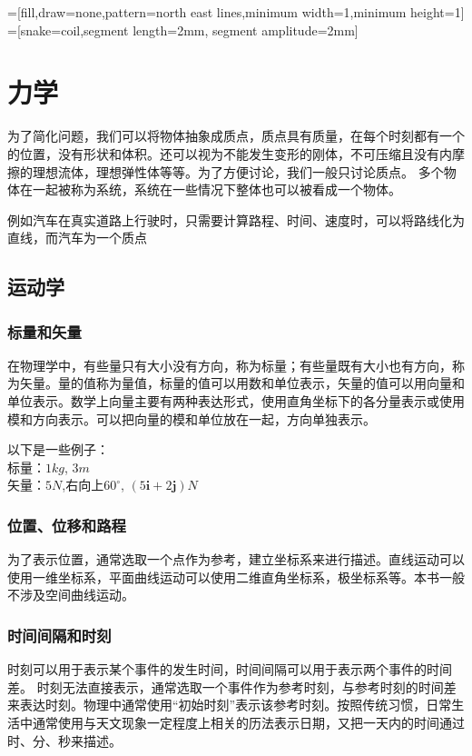 \usetikzlibrary{snakes, patterns}
=[fill,draw=none,pattern=north east lines,minimum width=1,minimum height=1]
=[snake=coil,segment length=2mm, segment amplitude=2mm]

\part{力学}
为了简化问题，我们可以将物体抽象成质点，质点具有质量，在每个时刻都有一个的位置，没有形状和体积。还可以视为不能发生变形的刚体，不可压缩且没有内摩擦的理想流体，理想弹性体等等。为了方便讨论，我们一般只讨论质点。
多个物体在一起被称为系统，系统在一些情况下整体也可以被看成一个物体。

例如汽车在真实道路上行驶时，只需要计算路程、时间、速度时，可以将路线化为直线，而汽车为一个质点

\chapter{运动学}
\section{标量和矢量}
在物理学中，有些量只有大小没有方向，称为标量；有些量既有大小也有方向，称为矢量。量的值称为量值，标量的值可以用数和单位表示，矢量的值可以用向量和单位表示。数学上向量主要有两种表达形式，使用直角坐标下的各分量表示或使用模和方向表示。可以把向量的模和单位放在一起，方向单独表示。

以下是一些例子： \\
标量：$1kg$, $3m$ \\
矢量：$5N$,右向上$60^\circ$, $(5\bm{i}+2\bm{j})N$ \\

\section{位置、位移和路程}
为了表示位置，通常选取一个点作为参考，建立坐标系来进行描述。直线运动可以使用一维坐标系，平面曲线运动可以使用二维直角坐标系，极坐标系等。本书一般不涉及空间曲线运动。

\section{时间间隔和时刻}
时刻可以用于表示某个事件的发生时间，时间间隔可以用于表示两个事件的时间差。
时刻无法直接表示，通常选取一个事件作为参考时刻，与参考时刻的时间差来表达时刻。物理中通常使用“初始时刻”表示该参考时刻。按照传统习惯，日常生活中通常使用与天文现象一定程度上相关的历法表示日期，又把一天内的时间通过时、分、秒来描述。

